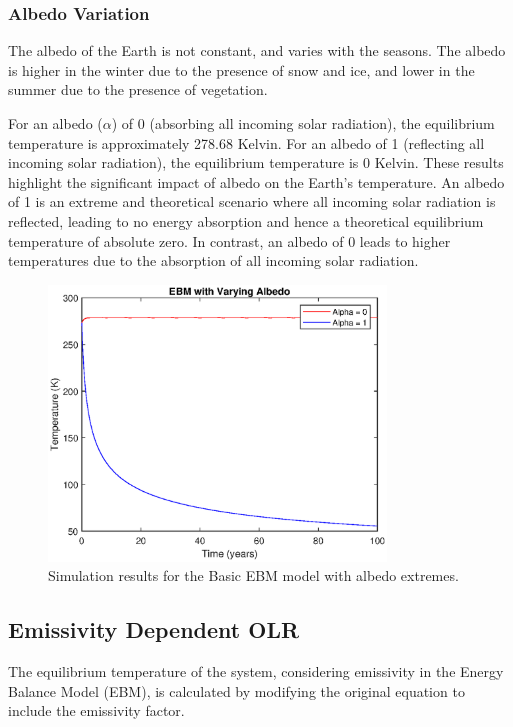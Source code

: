 \documentclass[12pt]{article}
\begin{document}
\subsubsection{Albedo Variation}
The albedo of the Earth is not constant, and varies with the seasons. The albedo is higher in the winter due to the presence of snow and ice, and lower in the summer due to the presence of vegetation. 

For an albedo ($\alpha$) of 0 (absorbing all incoming solar radiation), 
the equilibrium temperature is approximately 278.68 Kelvin.
For an albedo of 1 (reflecting all incoming solar radiation), 
the equilibrium temperature is 0 Kelvin.
These results highlight the significant impact of albedo on the Earth's temperature. 
An albedo of 1 is an extreme and theoretical scenario 
where all incoming solar radiation is reflected, 
leading to no energy absorption 
and hence a theoretical equilibrium temperature of absolute zero. 
In contrast, an albedo of 0 leads to higher temperatures 
due to the absorption of all incoming solar radiation. 

\begin{figure}[ht]
\centering
\includegraphics[width=0.8\textwidth]{images/albedo_extremes.eps}
\caption{Simulation results for the Basic EBM model with albedo extremes.}
\label{fig:albedoExtremes}
\end{figure}

\subsection{Emissivity Dependent OLR}
The equilibrium temperature of the system, 
considering emissivity in the Energy Balance Model (EBM), 
is calculated by modifying the original equation 
to include the emissivity factor. 
\end{document}
